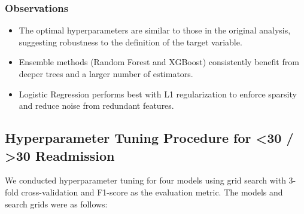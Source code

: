 \documentclass[11pt]{article}
\begin{document}
\subsubsection{Observations}
\begin{itemize}
    \item The optimal hyperparameters are similar to those in the original analysis, suggesting robustness to the definition of the target variable.
    \item Ensemble methods (Random Forest and XGBoost) consistently benefit from deeper trees and a larger number of estimators.
    \item Logistic Regression performs best with L1 regularization to enforce sparsity and reduce noise from redundant features.
\end{itemize}
\subsection{Hyperparameter Tuning Procedure for <30 / >30 Readmission}
We conducted hyperparameter tuning for four models using grid search with 3-fold cross-validation and F1-score as the evaluation metric. The models and search grids were as follows:
\end{document}
